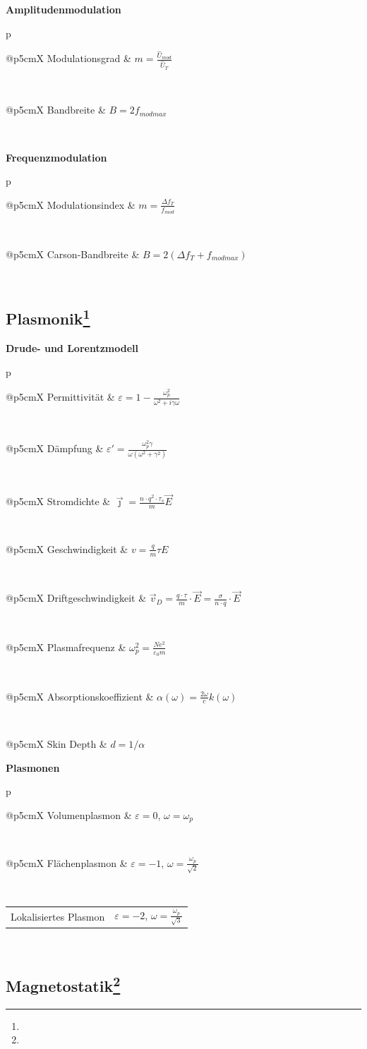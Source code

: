 \documentclass[12pt,a4paper, twoside]{article}
\makeatletter
\renewcommand{\=}[1]{\stackrel{#1}{=}}
\newcommand{\js}{\vec \jmath}
\newcommand{\eps}{\varepsilon}
\theoremstyle{definition}
\theoremstyle{remark}
\newcommand{\concept}[2]{%
\noindent
\begin{framed}
\noindent\textbf{#1}
\par\begin{tabular}{p{\linewidth}}
#2
\end{tabular}
\end{framed}
}
\newcommand{\f}[2]{%
\noindent\begin{tabularx}{\linewidth}{@{}p{5cm}X}
#1 & $#2$
\end{tabularx}}
\makeatother
\begin{document}
\concept{Amplitudenmodulation}{
\f{Modulationsgrad}{m = \frac{\hat U_{mod}}{\hat U_T}}\\
\f{Bandbreite}{B = 2 f_{mod max}}\\

}

\concept{Frequenzmodulation}{
\f{Modulationsindex}{m = \frac{\Delta f_T}{f_{mod}}}\\
\f{Carson-Bandbreite}{B = 2 (\Delta f_T + f_{mod max})}\\

}

\subsection[Plasmonik]{Plasmonik\let\thefootnote\relax\footnote{}}

\concept{Drude- und Lorentzmodell}{
\f{Permittivität}{\varepsilon = 1 - \frac{\omega_p^2}{\omega^2 + i \gamma \omega}}\\
\f{Dämpfung}{\eps' = \frac{\omega_p^2 \gamma}{\omega(\omega^2 + \gamma^2)}}\\
\f{Stromdichte}{\js =\frac{n \cdot q^2 \cdot \tau_s}{m} \vec{E}}\\
\f{Geschwindigkeit}{v = \frac{q}{m} \tau E}\\
\f{Driftgeschwindigkeit}{\vec{v}_D = \frac{q \cdot \tau}{m} \cdot \vec{E} = \frac{\sigma}{n \cdot q} \cdot \vec{E}}\\
\f{Plasmafrequenz}{\omega_p^2 = \frac{N e^2}{\varepsilon_0 m}}\\
\f{Absorptionskoeffizient}{\alpha(\omega) = \frac{2\omega}{c}k(\omega)}\\
\f{Skin Depth}{d = 1/\alpha}
}

\concept{Plasmonen}{
\f{Volumenplasmon}{\eps = 0$, $\omega = \omega_p}\\
\f{Flächenplasmon}{\eps = -1$, $\omega = \frac{\omega_p}{\sqrt{2}}}\\
\f{Lokalisiertes Plasmon}{\eps = -2$, $\omega = \frac{\omega_p}{\sqrt{3}}}\\
}


\subsection[Magnetostatik]{Magnetostatik\let\thefootnote\relax\footnote{}}
\end{document}
